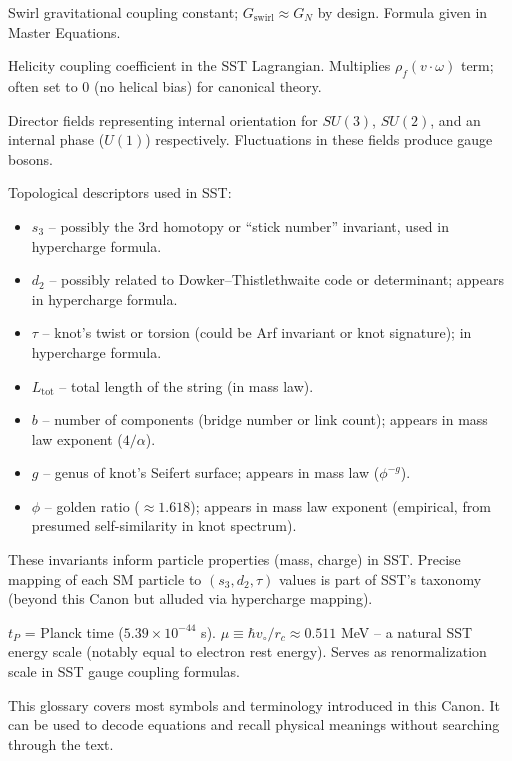 \documentclass[reprint,aps,onecolumn,nofootinbib]{revtex4-2}
\begin{document}
\begin{description}[leftmargin=1.3cm,labelsep=0.4cm, itemsep=1ex]
		\item[\textbf{$G_{\text{swirl}}$:}] Swirl gravitational coupling constant; $G_{\text{swirl}} \approx G_N$ by design. Formula given in Master Equations.
		\item[\textbf{$\chi_h$:}] Helicity coupling coefficient in the SST Lagrangian. Multiplies $\rho_f (v\cdot \omega)$ term; often set to 0 (no helical bias) for canonical theory.
		\item[\textbf{$\mathbf{U}_3, \mathbf{U}_2, \vartheta$:}] Director fields representing internal orientation for $SU(3)$, $SU(2)$, and an internal phase ($U(1)$) respectively. Fluctuations in these fields produce gauge bosons.
		\item[\textbf{Knot invariants $(s_3, d_2, \tau, L_{\text{tot}}, b, g, \phi)$:}] Topological descriptors used in SST:
		\begin{itemize}
			\item $s_3$ – possibly the 3rd homotopy or “stick number” invariant, used in hypercharge formula.
			\item $d_2$ – possibly related to Dowker–Thistlethwaite code or determinant; appears in hypercharge formula.
			\item $\tau$ – knot’s twist or torsion (could be Arf invariant or knot signature); in hypercharge formula.
			\item $L_{\text{tot}}$ – total length of the string (in mass law).
			\item $b$ – number of components (bridge number or link count); appears in mass law exponent ($4/\alpha$).
			\item $g$ – genus of knot’s Seifert surface; appears in mass law ($\phi^{-g}$).
			\item $\phi$ – golden ratio ($\approx1.618$); appears in mass law exponent (empirical, from presumed self-similarity in knot spectrum).
		\end{itemize}
		These invariants inform particle properties (mass, charge) in SST. Precise mapping of each SM particle to $(s_3, d_2, \tau)$ values is part of SST’s taxonomy (beyond this Canon but alluded via hypercharge mapping).
		\item[\textbf{Planck/core scales $(t_P, \mu)$:}] $t_P$ = Planck time ($5.39\times10^{-44}$ s). $\mu \equiv \hbar v_{\circ}/r_c \approx0.511$ MeV – a natural SST energy scale (notably equal to electron rest energy). Serves as renormalization scale in SST gauge coupling formulas.
	\end{description}

	This glossary covers most symbols and terminology introduced in this Canon. It can be used to decode equations and recall physical meanings without searching through the text.
\end{document}
